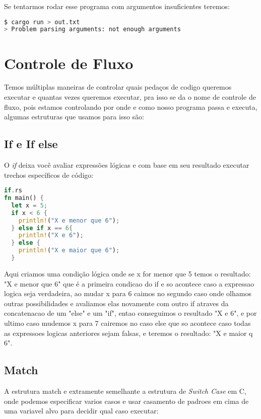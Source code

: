Se tentarmos rodar esse programa com argumentos insuficientes teremos:

\begin{lstlisting}[language=bash]
$ cargo run > out.txt
> Problem parsing arguments: not enough arguments
\end{lstlisting}

\section{Controle de Fluxo}

Temos múltiplas maneiras de controlar quais pedaços de codigo queremos executar e quantas vezes queremos executar, pra isso se da o nome de controle de fluxo, pois estamos controlando por onde e como nosso programa passa e executa, algumas estruturas que usamos para isso são:

\subsection{If e If else}

O \textit{if} deixa você avaliar expressões lógicas e com base em seu resultado executar trechos específicos de código:

\begin{lstlisting}[language=rust]
if.rs
fn main() {
  let x = 5;
  if x < 6 {
    println!("X e menor que 6");
  } else if x == 6{
    println!("X e 6");
  } else {
    println!("X e maior que 6");
  }
\end{lstlisting}

Aqui criamos uma condição lógica onde se x for menor que 5 temos o resultado: "X e menor que 6" que é a primeira condicao do if e so acontece caso a expressao logica seja verdadeira, ao mudar x para 6 caimos no segundo caso onde olhamos outras possibilidades e avaliamos elas novamente com outro if atraves da concatenacao de um "else" e um "if", entao conseguimos o resultado "X e 6", e por ultimo caso mudemos x para 7 cairemos no caso else que so acontece caso todas as expressoes logicas anteriores sejam falsas, e teremos o resultado: "X e maior q 6". 

\subsection{Match}

A estrutura match e extramente semelhante a estrutura de \textit{Switch Case} em C, onde podemos especificar varios casos e usar casamento de padroes em cima de uma variavel alvo para decidir qual caso executar:

